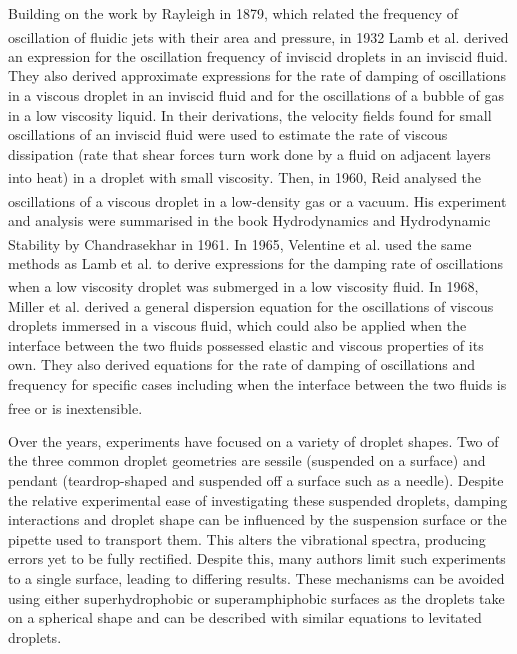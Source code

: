 \documentclass{physics_article_B}
\begin{document}
Building on the work by Rayleigh in 1879, which related the frequency of oscillation of fluidic jets with their area and pressure\textsuperscript{\cite{rayleigh}}, in 1932 Lamb et al. derived an expression for the oscillation frequency of inviscid droplets in an inviscid fluid. They also derived approximate expressions for the rate of damping of oscillations in a viscous droplet in an inviscid fluid and for the oscillations of a bubble of gas in a low viscosity liquid. In their derivations, the velocity fields found for small oscillations of an inviscid fluid were used to estimate the rate of viscous dissipation (rate that shear forces turn work done by a fluid on adjacent layers into heat) in a droplet with small viscosity\textsuperscript{\cite{lamb}}. Then, in 1960, Reid analysed the oscillations of a viscous droplet in a low-density gas or a vacuum\textsuperscript{\cite{reid}}. His experiment and analysis were summarised in the book Hydrodynamics and Hydrodynamic Stability by Chandrasekhar in 1961\textsuperscript{\cite{chandrasekhar}}. In 1965, Velentine et al. used the same methods as Lamb et al. to derive expressions for the damping rate of oscillations when a low viscosity droplet was submerged in a low viscosity fluid\textsuperscript{\cite{velentine}}. In 1968, Miller et al. derived a general dispersion equation for the oscillations of viscous droplets immersed in a viscous fluid, which could also be applied when the interface between the two fluids possessed elastic and viscous properties of its own. They also derived equations for the rate of damping of oscillations and frequency for specific cases including when the interface between the two fluids is free or is inextensible\textsuperscript{\cite{miller}}.


Over the years, experiments have focused on a variety of droplet shapes. Two of the three common droplet geometries are sessile (suspended on a surface)\cite{Temperton2012, vukasinovic, Backholm2017} and pendant (teardrop-shaped and suspended off a surface such as a needle)\cite{Temperton2012}. Despite the relative experimental ease of investigating these suspended droplets, damping interactions and droplet shape can be influenced by the suspension surface or the pipette used to transport them\cite{Sharp2011}. This alters the vibrational spectra, producing errors yet to be fully rectified\cite{harrold}. Despite this, many authors limit such experiments to a single surface\cite{Sharp2011}, leading to differing results. These mechanisms can be avoided using either superhydrophobic or superamphiphobic surfaces as the droplets take on a spherical shape and can be described with similar equations to levitated droplets.
\end{document}
